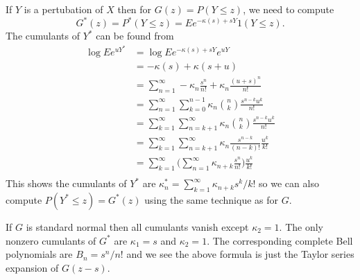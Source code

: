 \documentclass[11pt]{article}
\theoremstyle{definition}
\begin{document}
If \(Y\) is a pertubation of \(X\) then
for \(G(z) = P(Y\le z)\), we need to compute
\[
G^*(z) = P^*(Y\le z) = Ee^{-\kappa(s) + sY}1(Y\le z).
\]
The cumulants of \(Y^*\) can be found from
\begin{align*}
\log E e^{uY^*} &= \log E e^{-\kappa(s) + s Y} e^{uY}\\
&= -\kappa(s) + \kappa(s + u)\\
&= \sum_{n=1}^\infty -\kappa_n \frac{s^n}{n!} 
	+ \kappa_n \frac{(u + s)^n}{n!}\\
&= \sum_{n=1}^\infty \sum_{k=0}^{n-1} \kappa_n \binom{n}{k}
	\frac{s^{n - k}u^k}{n!}\\
&= \sum_{k=1}^\infty \sum_{n=k + 1}^\infty \kappa_n 
	\binom{n}{k}\frac{s^{n - k}u^k}{n!}\\
&= \sum_{k=1}^\infty \sum_{n=k + 1}^\infty \kappa_n \frac{s^{n-k}}{(n-k)!}
	\frac{u^k}{k!}\\
&= \sum_{k=1}^\infty 
	\bigl(\sum_{n=1}^\infty \kappa_{n+k} \frac{s^n}{n!}\bigr)
	\frac{u^k}{k!}\\
\end{align*}
This shows the cumulants of \(Y^*\) are 
\(\kappa^*_n = \sum_{k=1}^\infty \kappa_{n + k}s^k/k!\)
so we can also compute \(P(Y^* \le z) = G^*(z)\) using the same
technique as for \(G\).

If \(G\) is standard normal then all cumulants vanish except \(\kappa_2 = 1\).
The only nonzero cumulants of \(G^*\) are \(\kappa_1 = s\)
and \(\kappa_2 = 1\). The corresponding complete Bell polynomials
are \(B_n = s^n/n!\) and we see the above formula is just
the Taylor series expansion of \(G(z - s)\).
%
%
\end{document}
